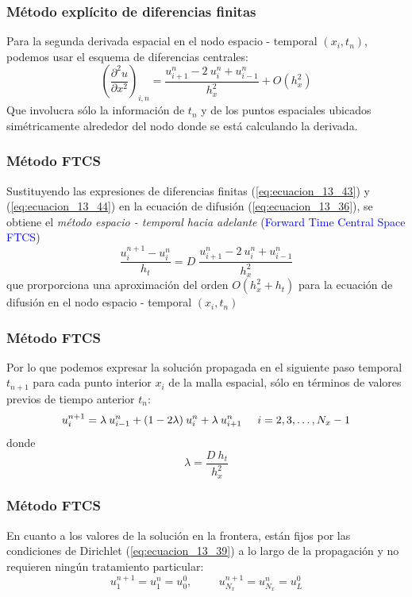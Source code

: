 \begin{frame}
\frametitle{Método explícito de diferencias finitas}	
Para la segunda derivada espacial en el nodo espacio - temporal $(x_{i}, t_{n})$, podemos usar el esquema de diferencias centrales:
\begin{equation}
\left( \dfrac{\partial^{2} u}{\partial x^{2}} \right)_{i,n} = \dfrac{u_{i + 1}^{n} - 2 \: u_{i}^{n} + u_{i - 1}^{n}}{h_{x}^{2}} + O(h_{x}^{2})
\label{eq:ecuacion_13_44}
\end{equation}
Que involucra sólo la información de $t_{n}$ y de los puntos espaciales ubicados simétricamente alrededor del nodo donde se está calculando la derivada.
\end{frame}
\begin{frame}
\frametitle{Método FTCS}
Sustituyendo las expresiones de diferencias finitas (\ref{eq:ecuacion_13_43}) y (\ref{eq:ecuacion_13_44}) en la ecuación de difusión (\ref{eq:ecuacion_13_36}), se obtiene el \emph{método espacio - temporal hacia adelante} (\textcolor{blue}{Forward Time Central Space FTCS})
\begin{equation}
\dfrac{u_{i}^{n + 1} - u_{i}^{n}}{h_{t}} =  D \; \dfrac{u_{i + 1}^{n} - 2 \: u_{i}^{n} + u_{i - 1}^{n}}{h_{x}^{2}}
\label{eq:ecuacion_13_45}
\end{equation}
\pause
que prorporciona una aproximación del orden $O(h_{x}^{2} + h_{t})$ para la ecuación de difusión en el nodo espacio - temporal $(x_{i}, t_{n})$
\end{frame}
\begin{frame}
\frametitle{Método FTCS}
Por lo que podemos expresar la solución propagada en el siguiente paso temporal $t_{n + 1}$ para cada punto interior $x_{i}$ de la malla espacial, sólo en términos de valores previos de tiempo anterior $t_{n}$:
\begin{equation}
u_{i}^{n + 1} = \lambda \: u_{i - 1}^{n} + (1 - 2 \lambda) \: u_{i}^{n} + \lambda \: u_{i + 1}^{n} \hspace{0.5cm} i = 2, 3, \ldots, N_{x} -1
\label{eq:ecuacion_13_46}
\end{equation}
donde
\begin{equation}
\lambda = \dfrac{D \: h_{t}}{h_{x}^{2}}
\label{eq:ecuacion_13_47}
\end{equation}
\end{frame}
\begin{frame}
\frametitle{Método FTCS}
En cuanto a los valores de la solución en la frontera, están fijos por las condiciones de Dirichlet (\ref{eq:ecuacion_13_39}) a lo largo de la propagación y no requieren ningún tratamiento particular:
\begin{equation}
u_{1}^{n + 1} = u_{1}^{n} = u_{0}^{0}, \hspace{1cm} u_{N_{x}}^{n + 1} = u_{N_{x}}^{n} = u_{L}^{0}
\label{eq:ecuacion_13_48}
\end{equation}
\end{frame}
